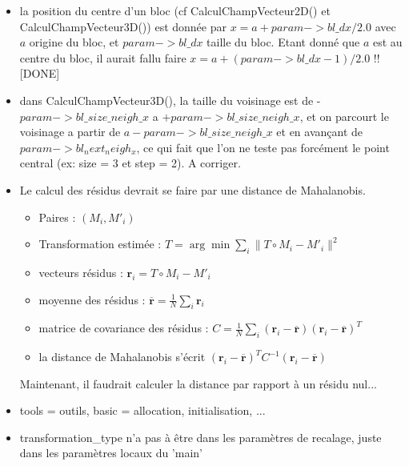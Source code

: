 \documentclass[10pt]{report}
\begin{document}
\begin{itemize}

\item  la position du centre d'un bloc (cf CalculChampVecteur2D() et CalculChampVecteur3D()) est donn\'ee par 
$x = a + param->bl\_dx / 2.0$ avec $a$ origine du bloc, et $param->bl\_dx$ taille du bloc. Etant donn\'e que $a$ est au centre du bloc, il aurait fallu faire 
$x = a + (param->bl\_dx -1)/ 2.0$ !! [DONE]

\item dans CalculChampVecteur3D(), la taille du voisinage est de -$param->bl\_size\_neigh\_x$ a $+param->bl\_size\_neigh\_x$, et on parcourt le voisinage a partir de $a - param->bl\_size\_neigh\_x$ et en avan\c{c}ant de $param->bl_next_neigh_x$, ce qui fait que l'on ne teste pas forc\'ement le point central (ex: size = 3 et step = 2). A corriger.

\item Le calcul des r\'esidus devrait se faire par une distance de Mahalanobis. 
\begin{itemize}
\item Paires : $(M_i, M'_i)$
\item Transformation estim\'ee : $T = \arg \min \sum_i \| T \circ M_i - M'_i \|^2$
\item vecteurs r\'esidus : $\mathbf{r}_i = T \circ M_i - M'_i$
\item moyenne des r\'esidus : 
$\overline{\mathbf{r}} = \frac{1}{N} \sum_i \mathbf{r}_i$
\item matrice de covariance des r\'esidus : 
$C = \frac{1}{N} \sum_i (\mathbf{r}_i - \overline{\mathbf{r}}) (\mathbf{r}_i- \overline{\mathbf{r}})^T$
\item la distance de Mahalanobis s'\'ecrit 
$(\mathbf{r}_i- \overline{\mathbf{r}})^T C^{-1} (\mathbf{r}_i- \overline{\mathbf{r}})$

\end{itemize}
Maintenant, il faudrait calculer la distance par rapport \`a un r\'esidu nul...





\item tools = outils, basic = allocation, initialisation, ...

\item transformation\_type n'a pas \`a \^etre dans les param\`etres de recalage, juste dans les param\`etres locaux du 'main'

\end{itemize}
\end{document}
